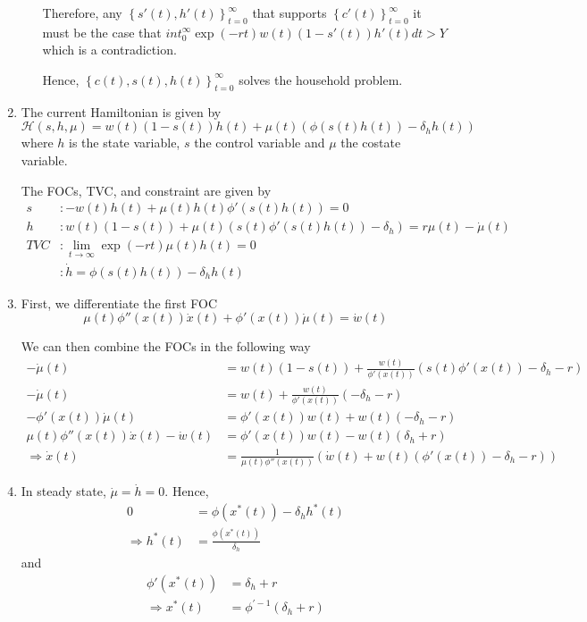 \documentclass[12pt]{article}
\newcommand{\1}{{\bf 1}} %
\newcommand{\cbra}[1]{\left\{ #1 \right\}}
\begin{document}
\begin{enumerate}[(1)]
\begin{enumerate}[(i)]
		Therefore, any $\cbra{s'(t),h'(t)}_{t=0}^\infty$ that supports $\cbra{c'(t)}_{t=0}^\infty$ it must be the case that $int_{0}^{\infty}\exp(-rt)w(t)(1-s'(t))h'(t)dt>Y$ which is a contradiction. 
		
		Hence, $\cbra{c(t),s(t),h(t)}_{t=0}^\infty$ solves the household problem.
		
	\end{enumerate}
	\item 
	The current Hamiltonian is given by
	\[
	\mathcal{H}(s,h,\mu) = w(t)(1-s(t))h(t)+\mu(t)(\phi(s(t)h(t))-\delta_hh(t))
	\]
	where $h$ is the state variable, $s$ the control variable and $\mu$ the costate variable.
	
	The FOCs, TVC, and constraint are given by
	\begin{align*}
		s&: -w(t)h(t)+\mu(t)h(t)\phi'(s(t)h(t)) = 0\\
		h&: w(t)(1-s(t))+\mu(t)(s(t)\phi'(s(t)h(t))-\delta_h)  = r\mu(t)-\dot{\mu}(t)\\
		TVC&: \lim_{t\to \infty} \exp(-rt)\mu(t)h(t)=0\\
		&: \dot{h} = \phi(s(t)h(t))-\delta_hh(t)
	\end{align*}
	
	
	\item 
	
	First, we differentiate the first FOC
	\[
	{\mu}(t)\phi''(x(t))\dot{x}(t)+\phi'(x(t))\dot{\mu}(t)= \dot{w}(t) 
	\]
	
	We can then combine the FOCs in the following way
	\begin{align*}
	-\dot{\mu}(t) &=w(t)(1-s(t))+\frac{w(t)}{\phi'(x(t))}(s(t)\phi'(x(t))-\delta_h-r)  \\
	-\dot{\mu}(t) &= w(t)+\frac{w(t)}{\phi'(x(t))}(-\delta_h-r)  \\
	-\phi'(x(t))\dot{\mu}(t) &=\phi'(x(t))w(t)+w(t)(-\delta_h-r) \\
		{\mu}(t)\phi''(x(t))\dot{x}(t)-\dot{w}(t) &=\phi'(x(t))w(t)-w(t)(\delta_h+r)  \\
		\Rightarrow  \dot{x}(t) & =\frac{1}{{\mu}(t)\phi''(x(t))} (\dot{w}(t)+w(t)(\phi'(x(t))-\delta_h-r)) 
\end{align*}

\item

In steady state, $\dot{\mu}=\dot{h}=0$. Hence,
\begin{align*}
0 &= \phi(x^*(t))-\delta_hh^*(t)\\
\Rightarrow h^*(t) & = \frac{\phi(x^*(t))}{\delta_h}
\end{align*}
and
\begin{align*}
	\phi'(x^*(t))  & = \delta_h+r\\
	\Rightarrow x^*(t)  & = \phi^{'-1}(\delta_h+r)
\end{align*}


\end{enumerate}
\end{document}
